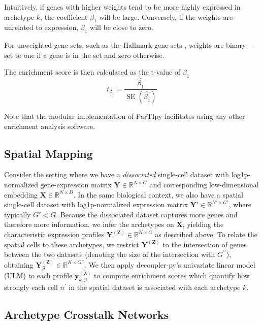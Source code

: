 \documentclass{article}
\begin{document}
Intuitively, if genes with higher weights tend to be more highly expressed in archetype $k$, the coefficient $\beta_1$ will be large. Conversely, if the weights are unrelated to expression, $\beta_1$ will be close to zero.

For unweighted gene sets, such as the Hallmark gene sets \autocite{subramanianGSEA2005}, weights are binary—set to one if a gene is in the set and zero otherwise.

The enrichment score is then calculated as the t-value of $\beta_1$
\begin{equation}
    t_{\beta_1} = \frac{\hat{\beta_1}}{\operatorname{SE}(\hat{\beta_1})}
\end{equation}

Note that the modular implementation of ParTIpy facilitates using any other enrichment analysis software.

\subsection{Spatial Mapping}
\label{subsec:spatial_mapping}

Consider the setting where we have a \emph{dissociated} single-cell dataset with log1p-normalized gene-expression matrix $\mathbf{Y}\in\mathbb{R}^{N\times G}$ and corresponding low-dimensional embedding $\mathbf{X}\in\mathbb{R}^{N\times D}$. In the same biological context, we also have a spatial single-cell dataset with log1p-normalized expression matrix $\mathbf{Y}'\in\mathbb{R}^{N'\times G'}$, where typically $G' < G$. Because the dissociated dataset captures more genes and therefore more information, we infer the archetypes on $\mathbf{X}$, yielding the characteristic expression profiles $\mathbf{Y}^{(\mathbf{Z})}\in\mathbb{R}^{K\times G}$ as described above. To relate the spatial cells to these archetypes, we restrict $\mathbf{Y}^{(\mathbf{Z})}$ to the intersection of genes between the two datasets (denoting the size of the intersection with $G^{\prime \prime}$), obtaining $\mathbf{Y}^{(\mathbf{Z})}_{\mathcal{G}}\in\mathbb{R}^{K\times G''}$. We then apply decoupler-py's univariate linear model (ULM) \autocite{badiaDecoupler2022} to each profile $\mathbf{y}^{(\mathbf{Z})}_{k,\mathcal{G}}$ to compute enrichment scores which quantify how strongly each cell $n^\prime$ in the spatial dataset is associated with each archetype $k$.

\subsection{Archetype Crosstalk Networks}
\label{subsec:crosstalk}
\end{document}
